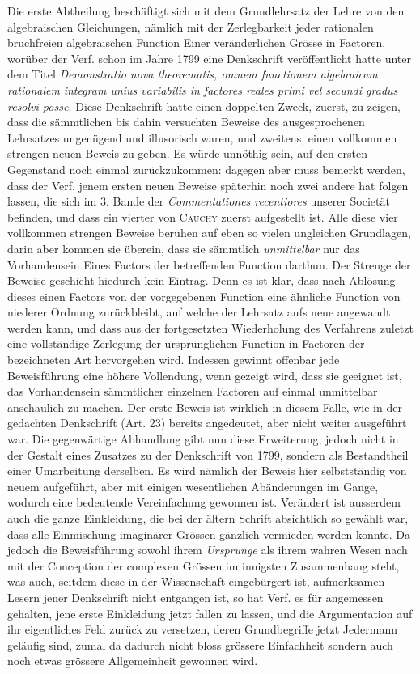 Die erste Abtheilung beschäftigt sich mit dem Grundlehrsatz der Lehre von den algebraischen Gleichungen, nämlich mit der Zerlegbarkeit jeder rationalen bruchfreien algebraischen Function Einer veränderlichen Grösse in Factoren, worüber der Verf. schon im Jahre 1799 eine Denkschrift veröffentlicht hatte unter dem Titel \textit{Demonstratio nova theorematis, omnem functionem algebraicam rationalem} \textit{integram unius variabilis in factores reales primi vel secundi gradus resolvi posse.} Diese Denkschrift hatte einen doppelten Zweck, zuerst, zu zeigen, dass die sämmtlichen bis dahin versuchten Beweise des ausgesprochenen Lehrsatzes ungenügend und illusorisch waren, und zweitens, einen vollkommen strengen neuen Beweis zu geben. Es würde unnöthig sein, auf den ersten Gegenstand noch einmal zurückzukommen: dagegen aber muss bemerkt werden, dass der Verf. jenem ersten neuen Beweise späterhin noch zwei andere hat folgen lassen, die sich im 3. Bande
der \textit{Commentationes recentiores} unserer Societät befinden, und dass ein vierter von \textsc{Cauchy} zuerst aufgestellt ist. Alle diese vier vollkommen strengen Beweise beruhen auf eben so vielen ungleichen Grundlagen, darin aber kommen sie überein, dass sie sämmtlich \textit{unmittelbar} nur das Vorhandensein Eines Factors der betreffenden Function darthun. Der Strenge der Beweise geschieht hiedurch kein Eintrag. Denn es ist klar, dass nach Ablösung dieses einen Factors von der vorgegebenen Function eine ähnliche Function von niederer Ordnung zurückbleibt, auf welche der Lehrsatz aufs neue angewandt werden kann, und dass aus der fortgesetzten Wiederholung des Verfahrens zuletzt eine vollständige Zerlegung der ursprünglichen Function in Factoren der bezeichneten Art hervorgehen wird. Indessen gewinnt offenbar jede Beweisführung eine höhere Vollendung, wenn gezeigt wird, dass sie geeignet ist, das Vorhandensein sämmtlicher einzelnen Factoren auf einmal unmittelbar anschaulich zu machen. Der erste Beweis ist wirklich in diesem Falle, wie in der gedachten Denkschrift (Art. 23) bereits angedeutet, aber nicht weiter ausgeführt war. Die gegenwärtige Abhandlung gibt nun diese Erweiterung, jedoch nicht in der Gestalt eines Zusatzes zu der Denkschrift von 1799, sondern als Bestandtheil einer Umarbeitung derselben. Es wird nämlich der Beweis hier selbstständig von neuem aufgeführt, aber mit einigen wesentlichen Abänderungen im Gange, wodurch eine bedeutende Vereinfachung gewonnen ist. Verändert ist ausserdem auch die ganze Einkleidung, die bei der ältern Schrift absichtlich so gewählt war, dass alle Einmischung imaginärer Grössen gänzlich vermieden werden konnte. Da jedoch die Beweisführung sowohl ihrem \textit{Ursprunge} als ihrem wahren Wesen nach mit der Conception der complexen Grössen im innigsten Zusammenhang steht, was auch, seitdem diese in der Wissenschaft eingebürgert ist, aufmerksamen Lesern jener Denkschrift nicht entgangen ist, so hat Verf. es für angemessen gehalten, jene erste Einkleidung jetzt fallen zu lassen, und die Argumentation auf ihr eigentliches Feld zurück zu versetzen, deren Grundbegriffe jetzt Jedermann geläufig sind, zumal da dadurch nicht bloss grössere Einfachheit sondern auch noch etwas grössere Allgemeinheit gewonnen wird.

